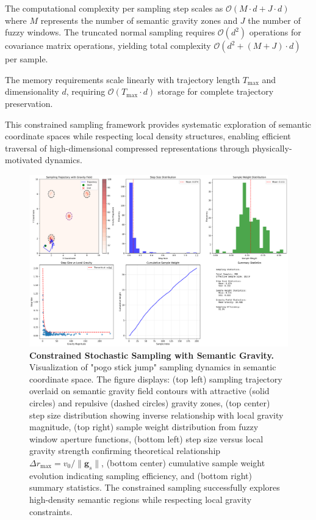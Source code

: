 \documentclass[11pt,a4paper]{article}
\begin{document}
The computational complexity per sampling step scales as $\mathcal{O}(M \cdot d + J \cdot d)$ where $M$ represents the number of semantic gravity zones and $J$ the number of fuzzy windows. The truncated normal sampling requires $\mathcal{O}(d^2)$ operations for covariance matrix operations, yielding total complexity $\mathcal{O}(d^2 + (M + J) \cdot d)$ per sample.

The memory requirements scale linearly with trajectory length $T_{\max}$ and dimensionality $d$, requiring $\mathcal{O}(T_{\max} \cdot d)$ storage for complete trajectory preservation.

This constrained sampling framework provides systematic exploration of semantic coordinate spaces while respecting local density structures, enabling efficient traversal of high-dimensional compressed representations through physically-motivated dynamics.

\begin{figure}[htbp]
\centering
\includegraphics[width=\textwidth]{images/constrained_sampling_demo.png}
\caption{\textbf{Constrained Stochastic Sampling with Semantic Gravity.} Visualization of "pogo stick jump" sampling dynamics in semantic coordinate space. The figure displays: (top left) sampling trajectory overlaid on semantic gravity field contours with attractive (solid circles) and repulsive (dashed circles) gravity zones, (top center) step size distribution showing inverse relationship with local gravity magnitude, (top right) sample weight distribution from fuzzy window aperture functions, (bottom left) step size versus local gravity strength confirming theoretical relationship $\Delta r_{\max} = v_0/\|\mathbf{g}_s\|$, (bottom center) cumulative sample weight evolution indicating sampling efficiency, and (bottom right) summary statistics. The constrained sampling successfully explores high-density semantic regions while respecting local gravity constraints.}
\label{fig:constrained-sampling}
\end{figure}
\end{document}
